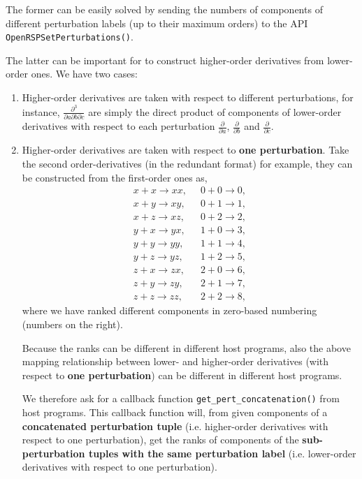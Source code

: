 The former can be easily solved by sending the numbers of components of
different perturbation labels (up to their maximum orders) to the \LibName API
\texttt{OpenRSPSetPerturbations()}.

The latter can be important for \LibName to construct higher-order derivatives
from lower-order ones. We have two cases:
\begin{enumerate}
  \item Higher-order derivatives are taken with respect to different
    perturbations, for instance, $\frac{\partial^{3}}{\partial a\partial b\partial c}$
    are simply the direct product of components of lower-order derivatives
    with respect to each perturbation $\frac{\partial}{\partial a}$,
    $\frac{\partial}{\partial b}$ and $\frac{\partial}{\partial c}$.
  \item Higher-order derivatives are taken with respect to
    \textbf{one perturbation}. Take the second order-derivatives (in the
    redundant format) for example, they can be constructed from the
    first-order ones as,
    \begin{align*}
      x+x\rightarrow xx,\;\; & 0+0\rightarrow 0,\\
      x+y\rightarrow xy,\;\; & 0+1\rightarrow 1,\\
      x+z\rightarrow xz,\;\; & 0+2\rightarrow 2,\\
      y+x\rightarrow yx,\;\; & 1+0\rightarrow 3,\\
      y+y\rightarrow yy,\;\; & 1+1\rightarrow 4,\\
      y+z\rightarrow yz,\;\; & 1+2\rightarrow 5,\\
      z+x\rightarrow zx,\;\; & 2+0\rightarrow 6,\\
      z+y\rightarrow zy,\;\; & 2+1\rightarrow 7,\\
      z+z\rightarrow zz,\;\; & 2+2\rightarrow 8,
    \end{align*}
    where we have ranked different components in zero-based numbering (numbers
    on the right).

    Because the ranks can be different in different host programs, also the
    above mapping relationship between lower- and higher-order derivatives
    (with respect to \textbf{one perturbation}) can be different in different
    host programs.

    We therefore ask for a callback function \texttt{get\_pert\_concatenation()}
    from host programs. This callback function will, from given components of
    a \textbf{concatenated perturbation tuple} (i.e. higher-order derivatives
    with respect to one perturbation), get the ranks of components of the
    \textbf{sub-perturbation tuples with the same perturbation label} (i.e.
    lower-order derivatives with respect to one perturbation).
\end{enumerate}

